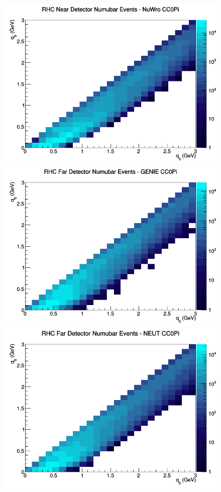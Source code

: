 \documentclass[12pt]{article}
\begin{document}
\begin{figure}[h]
\includegraphics[width=\linewidth]{q0_q3/nominal/CC0Pi_RHC_ND_numubar_q3_q0_NuWro.png}
\endminipage
\newline
{}
\includegraphics[width=\linewidth]{q0_q3/nominal/CC0Pi_RHC_FD_numubar_q3_q0_GENIE.png}
\endminipage
{}
\includegraphics[width=\linewidth]{q0_q3/nominal/CC0Pi_RHC_FD_numubar_q3_q0_NEUT.png}

\end{figure}
\end{document}
